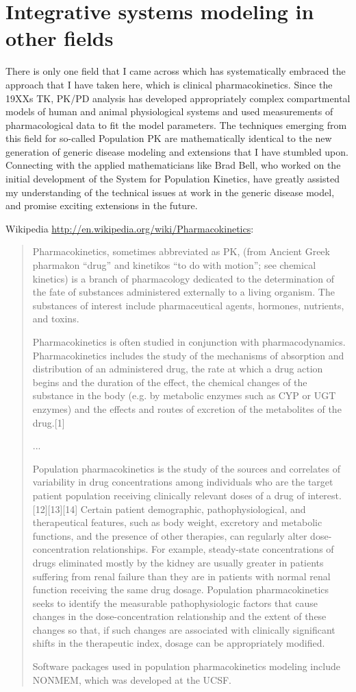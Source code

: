 \section{Integrative systems modeling in other fields}
There is only one field that I came across which has
systematically embraced the approach that I have taken here, which is
clinical pharmacokinetics. Since the 19XXs TK, PK/PD analysis has
developed appropriately complex compartmental models of human and
animal physiological systems and used measurements of pharmacological
data to fit the model parameters. The techniques emerging from this
field for so-called Population PK are mathematically identical to the
new generation of generic disease modeling and extensions that I have
stumbled upon. Connecting with the applied mathematicians like Brad
Bell, who worked on the initial development of the System for
Population Kinetics, have greatly assisted my understanding of the
technical issues at work in the generic disease model, and promise
exciting extensions in the future.

Wikipedia \url{http://en.wikipedia.org/wiki/Pharmacokinetics}:
\begin{quote}
Pharmacokinetics, sometimes abbreviated as PK, (from Ancient Greek
pharmakon ``drug'' and kinetikos ``to do with motion''; see chemical
kinetics) is a branch of pharmacology dedicated to the determination
of the fate of substances administered externally to a living
organism. The substances of interest include pharmaceutical agents,
hormones, nutrients, and toxins.

Pharmacokinetics is often studied in conjunction with
pharmacodynamics. Pharmacokinetics includes the study of the
mechanisms of absorption and distribution of an administered drug, the
rate at which a drug action begins and the duration of the effect, the
chemical changes of the substance in the body (e.g. by metabolic
enzymes such as CYP or UGT enzymes) and the effects and routes of
excretion of the metabolites of the drug.[1]

...

Population pharmacokinetics is the study of the sources and correlates
of variability in drug concentrations among individuals who are the
target patient population receiving clinically relevant doses of a
drug of interest.[12][13][14] Certain patient demographic,
pathophysiological, and therapeutical features, such as body weight,
excretory and metabolic functions, and the presence of other
therapies, can regularly alter dose-concentration relationships. For
example, steady-state concentrations of drugs eliminated mostly by the
kidney are usually greater in patients suffering from renal failure
than they are in patients with normal renal function receiving the
same drug dosage. Population pharmacokinetics seeks to identify the
measurable pathophysiologic factors that cause changes in the
dose-concentration relationship and the extent of these changes so
that, if such changes are associated with clinically significant
shifts in the therapeutic index, dosage can be appropriately modified.

Software packages used in population pharmacokinetics modeling include
NONMEM, which was developed at the UCSF.
\end{quote}

